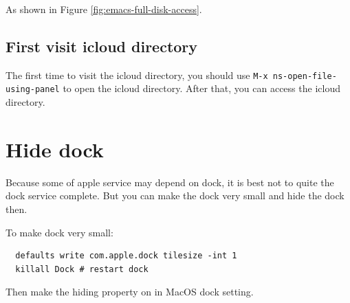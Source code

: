 As shown in Figure \ref{fig:emacs-full-disk-access}.


\subsection{First visit icloud directory}

The first time to visit the icloud directory, you should use
\verb|M-x ns-open-file-using-panel| to open the icloud directory.
After that, you can access the icloud directory.


\section{Hide dock}

Because some of apple service may depend on dock, it is best not to quite the dock service complete.
But you can make the dock very small and hide the dock then.

To make dock very small:
\lstset{language=Sh}
\begin{lstlisting}
  defaults write com.apple.dock tilesize -int 1
  killall Dock # restart dock
\end{lstlisting}


Then make the hiding property on in MacOS dock setting.